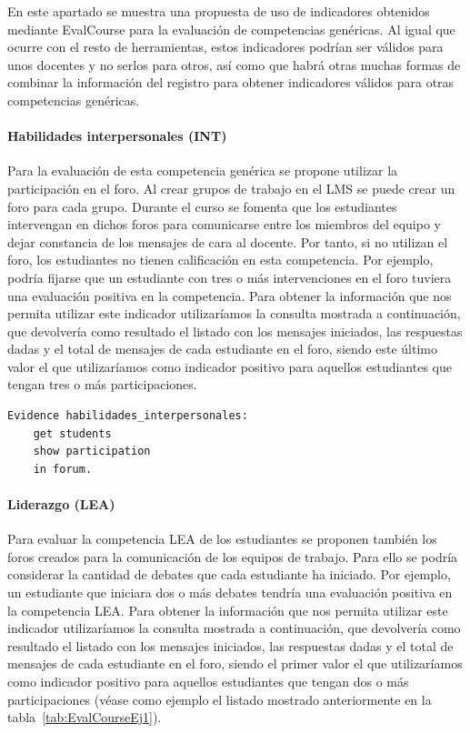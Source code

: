 			En este apartado se muestra una propuesta de uso de indicadores obtenidos mediante EvalCourse para la evaluación de competencias genéricas. Al igual que ocurre con el resto de herramientas, estos indicadores podrían ser válidos para unos docentes y no serlos para otros, así como que habrá otras muchas formas de combinar la información del registro para obtener indicadores válidos para otras competencias genéricas.


				\paragraph*{Habilidades interpersonales (INT)}
				Para la evaluación de esta competencia genérica se propone utilizar la participación en el foro. Al crear grupos de trabajo en el LMS se puede crear un foro para cada grupo. Durante el curso se fomenta que los estudiantes intervengan en dichos foros para comunicarse entre los miembros del equipo y dejar constancia de los mensajes de cara al docente. Por tanto, si no utilizan el foro, los estudiantes no tienen calificación en esta competencia. Por ejemplo, podría fijarse que un estudiante con tres o más intervenciones en el foro tuviera una evaluación positiva en la competencia. Para obtener la información que nos permita utilizar este indicador utilizaríamos la consulta mostrada a continuación, que devolvería como resultado el listado con los mensajes iniciados, las respuestas dadas y el total de mensajes de cada estudiante en el foro, siendo este último valor el que utilizaríamos como indicador positivo para aquellos estudiantes que tengan tres o más participaciones.

\begin{verbatim}
Evidence habilidades_interpersonales: 
	get students
	show participation
	in forum.
\end{verbatim}

				\paragraph*{Liderazgo (LEA)}
				Para evaluar la competencia LEA de los estudiantes se proponen también los foros creados para la comunicación de los equipos de trabajo. Para ello se podría considerar la cantidad de debates que cada estudiante ha iniciado. Por ejemplo, un estudiante que iniciara dos o más debates tendría una evaluación positiva en la competencia LEA. Para obtener la información que nos permita utilizar este indicador utilizaríamos la consulta mostrada a continuación, que devolvería como resultado el listado con los mensajes iniciados, las respuestas dadas y el total de mensajes de cada estudiante en el foro, siendo el primer valor el que utilizaríamos como indicador positivo para aquellos estudiantes que tengan dos o más participaciones (véase como ejemplo el listado mostrado anteriormente en la tabla~\ref{tab:EvalCourseEj1}).

